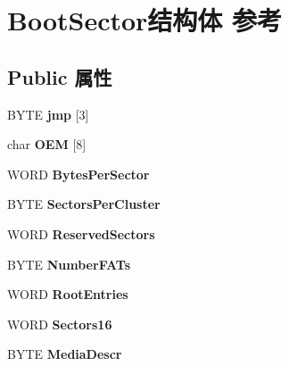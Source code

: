 \hypertarget{struct_boot_sector}{}\section{Boot\+Sector结构体 参考}
\label{struct_boot_sector}
\subsection*{Public 属性}
\begin{DoxyCompactItemize}
\item 
\mbox{\label{struct_boot_sector_a8b1269f9ca06b585a122d2f507049025}} 
B\+Y\+TE {\bfseries jmp} \mbox{[}3\mbox{]}
\item 
\mbox{\label{struct_boot_sector_af8a7634f39d24a19a77b46a9dcab3525}} 
char {\bfseries O\+EM} \mbox{[}8\mbox{]}
\item 
\mbox{\label{struct_boot_sector_af80e6d9293062222087aeb5e6e5b776f}} 
W\+O\+RD {\bfseries Bytes\+Per\+Sector}
\item 
\mbox{\label{struct_boot_sector_abe755b574b4d59420cd0d8119433b01b}} 
B\+Y\+TE {\bfseries Sectors\+Per\+Cluster}
\item 
\mbox{\label{struct_boot_sector_a8d12e93fa7680802ac8cdaf5781aee83}} 
W\+O\+RD {\bfseries Reserved\+Sectors}
\item 
\mbox{\label{struct_boot_sector_a6090eb1d2e8449963aa9c09652695e83}} 
B\+Y\+TE {\bfseries Number\+F\+A\+Ts}
\item 
\mbox{\label{struct_boot_sector_a607d60bcb38835d688fe2a3692356b7d}} 
W\+O\+RD {\bfseries Root\+Entries}
\item 
\mbox{\label{struct_boot_sector_a146e002413bb16a82a5c015c8fb02b50}} 
W\+O\+RD {\bfseries Sectors16}
\item 
\mbox{\label{struct_boot_sector_ac1dabb3342fc48d07b19a3e5fb5ab38a}} 
B\+Y\+TE {\bfseries Media\+Descr}
\item 
\mbox{\label{struct_boot_sector_ab4bf2a600cc5a461ae65ccd1c8d43664}} 

\end{DoxyCompactItemize}
